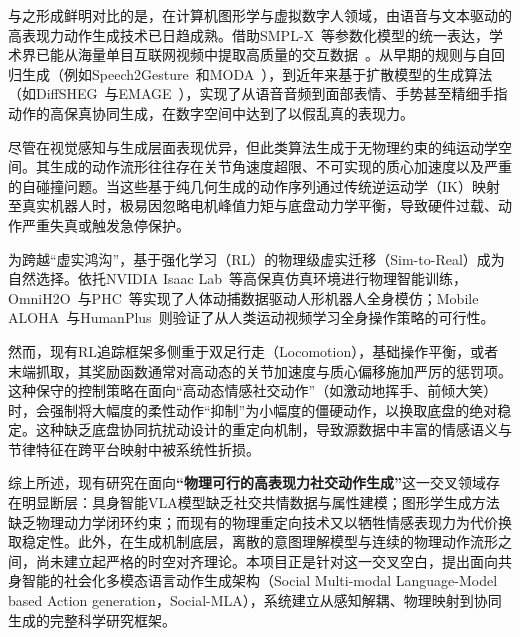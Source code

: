 与之形成鲜明对比的是，在计算机图形学与虚拟数字人领域，由语音与文本驱动的高表现力动作生成技术已日趋成熟。借助SMPL-X~\cite{pavlakos2019expressive}等参数化模型的统一表达，学术界已能从海量单目互联网视频中提取高质量的交互数据~\cite{wu2026pear}。从早期的规则与自回归生成（例如Speech2Gesture~\cite{ginosar2019learning}和MODA~\cite{Liu2023MODA}），到近年来基于扩散模型的生成算法（如DiffSHEG~\cite{Chen2024DiffSHEG}与EMAGE~\cite{liu2024emage}），实现了从语音音频到面部表情、手势甚至精细手指动作的高保真协同生成，在数字空间中达到了以假乱真的表现力。

尽管在视觉感知与生成层面表现优异，但此类算法生成于无物理约束的纯运动学空间。其生成的动作流形往往存在关节角速度超限、不可实现的质心加速度以及严重的自碰撞问题。当这些基于纯几何生成的动作序列通过传统逆运动学（IK）映射至真实机器人时，极易因忽略电机峰值力矩与底盘动力学平衡，导致硬件过载、动作严重失真或触发急停保护。

为跨越``虚实鸿沟''，基于强化学习（RL）的物理级虚实迁移（Sim-to-Real）成为自然选择。依托NVIDIA Isaac Lab~\cite{nvidia2023isaac}等高保真仿真环境进行物理智能训练，OmniH2O~\cite{he2024omnih2o}与PHC~\cite{luo2023phc}等实现了人体动捕数据驱动人形机器人全身模仿；Mobile ALOHA~\cite{fu2024mobilealoha}与HumanPlus~\cite{Fu2024HumanPlusHS}则验证了从人类运动视频学习全身操作策略的可行性。

然而，现有RL追踪框架多侧重于双足行走（Locomotion），基础操作平衡，或者末端抓取，其奖励函数通常对高动态的关节加速度与质心偏移施加严厉的惩罚项。这种保守的控制策略在面向``高动态情感社交动作''（如激动地挥手、前倾大笑）时，会强制将大幅度的柔性动作``抑制''为小幅度的僵硬动作，以换取底盘的绝对稳定。这种缺乏底盘协同抗扰动设计的重定向机制，导致源数据中丰富的情感语义与节律特征在跨平台映射中被系统性折损。

综上所述，现有研究在面向\textbf{``物理可行的高表现力社交动作生成''}这一交叉领域存在明显断层：具身智能VLA模型缺乏社交共情数据与属性建模；图形学生成方法缺乏物理动力学闭环约束；而现有的物理重定向技术又以牺牲情感表现力为代价换取稳定性。此外，在生成机制底层，离散的意图理解模型与连续的物理动作流形之间，尚未建立起严格的时空对齐理论。本项目正是针对这一交叉空白，提出面向共身智能的社会化多模态语言动作生成架构（Social Multi-modal Language-Model based Action generation，Social-MLA），系统建立从感知解耦、物理映射到协同生成的完整科学研究框架。

